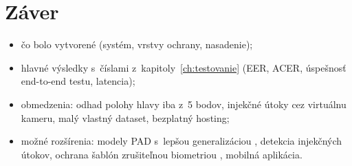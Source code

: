 \chapter{Záver}

\begin{itemize}
  \item čo bolo vytvorené (systém, vrstvy ochrany, nasadenie);
  \item hlavné výsledky s~číslami z~kapitoly~\ref{ch:testovanie} (EER, ACER, úspešnosť
        end-to-end testu, latencia);
  \item obmedzenia: odhad polohy hlavy iba z~5 bodov, injekčné útoky cez virtuálnu
        kameru, malý vlastný dataset, bezplatný hosting;
  \item možné rozšírenia: modely PAD s~lepšou generalizáciou \cite{srivatsan2023flip},
        detekcia injekčných útokov, ochrana šablón zrušiteľnou biometriou
        \cite{abdullahi2024template}, mobilná aplikácia.
\end{itemize}

